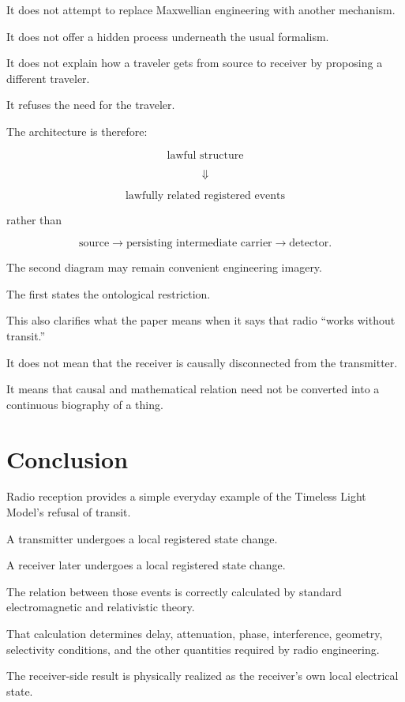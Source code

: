 \documentclass[12pt,onecolumn]{article}
\begin{document}
It does not attempt to replace Maxwellian engineering with another
mechanism.

It does not offer a hidden process underneath the usual formalism.

It does not explain how a traveler gets from source to receiver by
proposing a different traveler.

It refuses the need for the traveler.

The architecture is therefore:

\[
\text{lawful structure}
\]

\[
\Downarrow
\]

\[
\text{lawfully related registered events}
\]

rather than

\[
\text{source}
\rightarrow
\text{persisting intermediate carrier}
\rightarrow
\text{detector}.
\]

The second diagram may remain convenient engineering imagery.

The first states the ontological restriction.

This also clarifies what the paper means when it says that radio
``works without transit.''

It does not mean that the receiver is causally disconnected from the
transmitter.

It means that causal and mathematical relation need not be converted
into a continuous biography of a thing.

\section{Conclusion}

Radio reception provides a simple everyday example of the Timeless Light
Model's refusal of transit.

A transmitter undergoes a local registered state change.

A receiver later undergoes a local registered state change.

The relation between those events is correctly calculated by standard
electromagnetic and relativistic theory.

That calculation determines delay, attenuation, phase, interference,
geometry, selectivity conditions, and the other quantities required by
radio engineering.

The receiver-side result is physically realized as the receiver's own
local electrical state.
\end{document}
